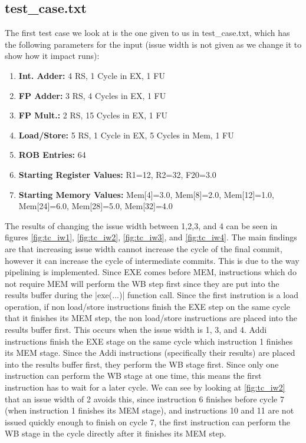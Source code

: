 \documentclass[12pt, twocolumn]{article}
\begin{document}
\subsection{test\_case.txt}
The first test case we look at is the one given to us in test\_case.txt, which has the following parameters for the input (issue width is not given as we change it to show how it impact runs):
\begin{enumerate}[nosep, wide, labelindent=0pt]
  \item[] \textbf{Int. Adder:} 4 RS, 1 Cycle in EX, 1 FU
  \item[] \textbf{FP Adder:} 3 RS, 4 Cycles in EX, 1 FU
  \item[] \textbf{FP Mult.:} 2 RS, 15 Cycles in EX, 1 FU
  \item[] \textbf{Load/Store:} 5 RS, 1 Cycle in EX, 5 Cycles in Mem, 1 FU
  \item[] \textbf{ROB Entries:} 64
  \item[] \textbf{Starting Register Values:} R1=12, R2=32, F20=3.0
  \item[] \textbf{Starting Memory Values:} Mem[4]=3.0, Mem[8]=2.0, Mem[12]=1.0, Mem[24]=6.0, Mem[28]=5.0, Mem[32]=4.0
\end{enumerate}

The results of changing the issue width between 1,2,3, and 4 can be seen in figures \ref{fig:tc_iw1}, \ref{fig:tc_iw2}, \ref{fig:tc_iw3}, and \ref{fig:tc_iw4}. The main findings are that increasing issue width cannot increase the cycle of the final commit, however it can increase the cycle of intermediate commits. This is due to the way pipelining is implemented. Since EXE comes before MEM, instructions which do not require MEM will perform the WB step first since they are put into the results buffer during the |exe(...)| function call. Since the first instrution is a load operation, if non load/store instructions finish the EXE step on the same cycle that it finishes its MEM step, the non load/store instructions are placed into the results buffer first. This occurs when the issue width is 1, 3, and 4. Addi instructions finish the EXE stage on the same cycle which instruction 1 finishes its MEM stage. Since the Addi instructions (specifically their results) are placed into the results buffer first, they perform the WB stage first. Since only one instruction can perform the WB stage at one time, this means the first instruction has to wait for a later cycle. We can see by looking at \ref{fig:tc_iw2} that an issue width of 2 avoids this, since instruction 6 finishes before cycle 7 (when instruction 1 finishes its MEM stage), and instructions 10 and 11 are not issued quickly enough to finish on cycle 7, the first instruction can perform the WB stage in the cycle directly after it finishes its MEM step.
\end{document}

